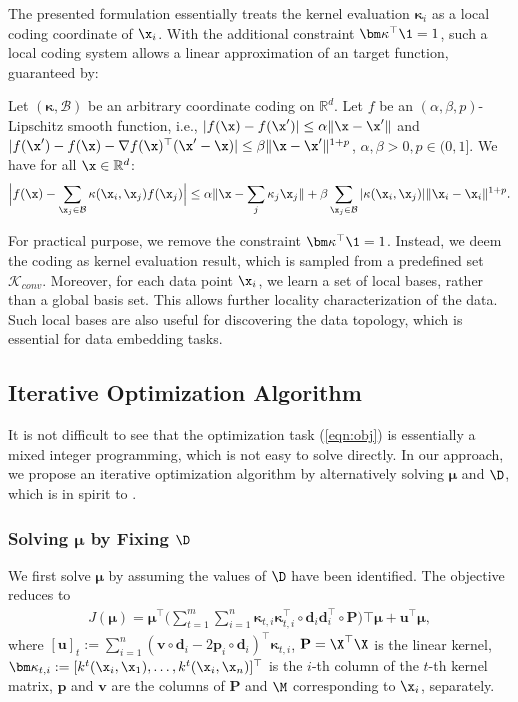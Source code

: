The presented formulation essentially treats the kernel evaluation $\bm\kappa_i$ as a local coding coordinate of $\x_i$. With the additional constraint $\bm\kappa^\top\1 = 1$, such a local coding system allows a linear approximation of an target function, guaranteed by\cite{nips/YuZG09}:
\begin{theorem}
Let $(\bm\kappa, \mathcal B)$ be an arbitrary coordinate coding on $\mathbb R^d$. Let $f$ be an $(\alpha, \beta, p)$-Lipschitz smooth function, i.e., $| f(\x) - f(\x')| \leq \alpha \| \x - \x'\|$ and $|f(\x') - f(\x) - \nabla f(\x)^\top(\x' - \x)| \leq \beta\|\x - \x'\|^{1+p}$, $\alpha, \beta>0, p\in(0, 1]$. We have for all $\x\in\mathbb R^d$:
\[
\Big| f(\x) - \sum_{\x_j\in\mathcal B}\kappa(\x_i, \x_j)f(\x_j) \Big| \leq \alpha\| \x - \sum_j\kappa_j\x_j \| + \beta \sum_{\x_j\in\mathcal B}| \kappa(\x_i, \x_j) | \| \x_i - \x_i \|^{1+p}.
\]
\end{theorem}
For practical purpose, we remove the constraint $\bm\kappa^\top\1=1$. Instead, we deem the coding as kernel evaluation result, which is sampled from a predefined set $\mathcal K_{conv}$. Moreover, for each data point $\x_i$, we learn a set of local bases, rather than a global basis set. This allows further locality characterization of the data. Such local bases are also useful for discovering the data topology, which is essential for data embedding tasks.

\subsection{Iterative Optimization Algorithm}

It is not difficult to see that the optimization task (\ref{eqn:obj}) is essentially a mixed integer programming, which is not easy to solve directly. In our approach, we propose an iterative optimization algorithm by alternatively solving $\bm\mu$ and $\D$, which is in spirit to \cite{icml/TanWT10}.

\subsubsection{Solving $\bm\mu$ by Fixing $\D$}

We first solve $\bm\mu$ by assuming the values of $\D$ have been identified. The objective reduces to
\begin{eqnarray}
J(\bm\mu) = \bm\mu^\top\bigg(  \sum_{t=1}^m \sum_{i=1}^n\bm\kappa_{t,i}\bm\kappa_{t,i}^\top\circ\mathbf d_i\mathbf d_i^\top\circ\mathbf P              \bigg)\top\bm\mu + \mathbf u^\top\bm\mu,
\end{eqnarray}
where $[\mathbf u]_t:= \sum_{i=1}^n(\mathbf v\circ\mathbf d_i - 2\mathbf p_i\circ\mathbf d_i)^\top\bm\kappa_{t,i}$, $\mathbf P = \X^\top\X$ is the linear kernel, $\bm\kappa_{t,i} :=[k^t(\x_i,\x_1),\ldots,k^t(\x_i,\x_n)]^\top$ is the $i$-th column of the $t$-th kernel matrix,  $\mathbf p$ and $\mathbf v$ are the columns of $\mathbf P$ and $\M$ corresponding to $\x_i$, separately.

